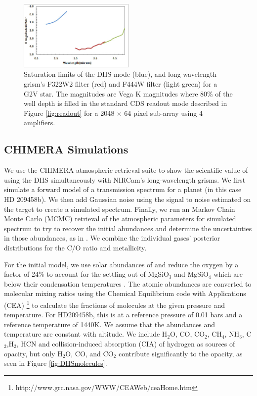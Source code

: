 \documentclass{emulateapj}
\begin{document}
\begin{figure}[!ht]
\includegraphics[width=0.5\textwidth]{sat_limits.jpg}
\caption{Saturation limits of the DHS mode (blue), and long-wavelength grism's F322W2 filter (red) and F444W filter (light green) for a G2V star. The magnitudes are Vega K magnitudes where 80\% of the well depth is filled in the standard CDS readout mode described in Figure \ref{fig:readout}  for a 2048 $\times$ 64 pixel sub-array using 4 amplifiers.}\label{fig:DHSaps}
\end{figure}

\subsection{CHIMERA Simulations}\label{sec:simulations}

We use the CHIMERA atmospheric retrieval suite \citep{line2013chimera,line2014CtOsecE} to show the scientific value of using the DHS simultaneously with NIRCam's long-wavelength grisms. We first simulate a forward model of a transmission spectrum for a planet (in this case HD 209458b). We then add Gaussian noise using the signal to noise estimated on the target to create a simulated spectrum. Finally, we run an Markov Chain Monte Carlo (MCMC) retrieval of the atmospheric parameters for simulated spectrum to try to recover the initial abundances and determine the uncertainties in those abundances, as in \citet{greene2016jwst_trans}. We combine the individual gases' posterior distributions for the C/O ratio and metallicity.

For the initial model, we use solar abundances of \citet{asplund} and reduce the oxygen by a factor of 24\% to account for the settling out of MgSiO$_3$ and MgSiO$_4$ which are below their condensation temperatures \citep{sing2016continuum}. The atomic abundances are converted to molecular mixing ratios using the Chemical Equilibrium code with Applications (CEA) \footnote{http://www.grc.nasa.gov/WWW/CEAWeb/ceaHome.htm}\citep{gordon1996cea} to calculate the fractions of molecules at the given pressure and temperature. For HD209458b, this is at a reference pressure of 0.01 bars and a reference temperature of 1440K. We assume that the abundances and temperature are constant with altitude. We include H$_2$O, CO, CO$_2$, CH$_4$, NH$_3$, C$_2$,H$_2$, HCN and collision-induced absorption (CIA) of hydrogen as sources of opacity, but only H$_2$O, CO, and CO$_2$ contribute significantly to the opacity, as seen in Figure \ref{fig:DHSmolecules}.
\end{document}
